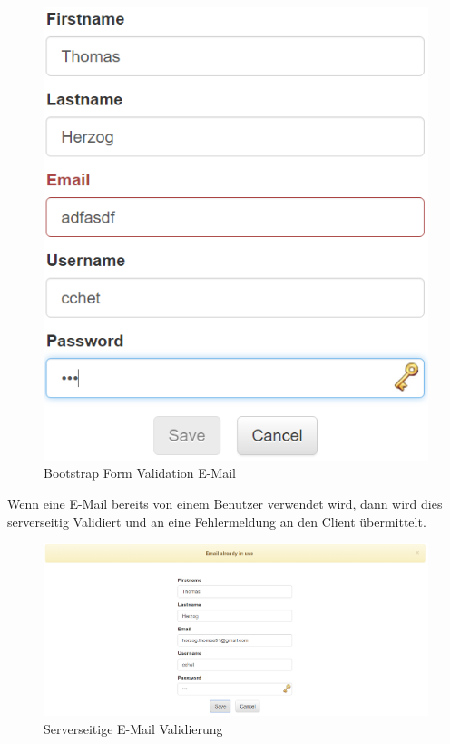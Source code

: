 \documentclass[11pt, a4paper, twoside]{article}   	%
\begin{document}
\begin{figure}[h]
	\centering
	\includegraphics[scale=0.5]{images/registration_client_validation_email.PNG}
	\caption
	{Bootstrap Form Validation E-Mail}
\end{figure}
\newpage
Wenn eine E-Mail bereits von einem Benutzer verwendet wird, dann wird dies serverseitig Validiert und an eine Fehlermeldung an den Client übermittelt.
\begin{figure}[h]
	\centering
	\includegraphics[scale=0.4]{images/registration_server_validation_email.PNG}
	\caption
	{Serverseitige E-Mail Validierung}
\end{figure}\\\\
\end{document}
